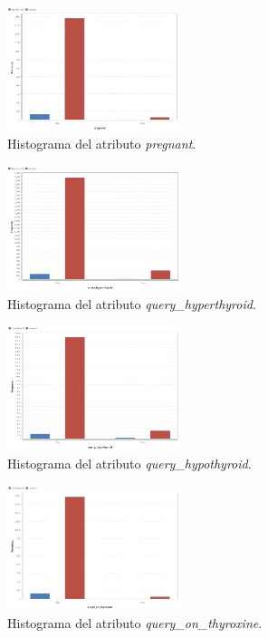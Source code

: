 \documentclass[osajnl,twocolumn,showpacs,superscriptaddress,10pt,floatfix]{revtex4-1} %
\begin{document}
\begin{figure}[H]
    \centering
    \includegraphics[width=0.45\textwidth]{analysis/histogram_pregnant}
    \caption{Histograma del atributo \textit{pregnant}.}
    \label{figure:pregnant}
\end{figure}

\begin{figure}[H]
    \centering
    \includegraphics[width=0.45\textwidth]{analysis/histogram_query_hyperthyroid}
    \caption{Histograma del atributo \textit{query\_hyperthyroid}.}
    \label{figure:query_hyperthyroid}
\end{figure}

\begin{figure}[H]
    \centering
    \includegraphics[width=0.45\textwidth]{analysis/histogram_query_hypothyroid}
    \caption{Histograma del atributo \textit{query\_hypothyroid}.}
    \label{figure:query_hypothyroid}
\end{figure}

\begin{figure}[H]
    \centering
    \includegraphics[width=0.45\textwidth]{analysis/histogram_query_on_thyroxine}
    \caption{Histograma del atributo \textit{query\_on\_thyroxine}.}
    \label{figure:query_on_thyroxine}
\end{figure}
\end{document}
